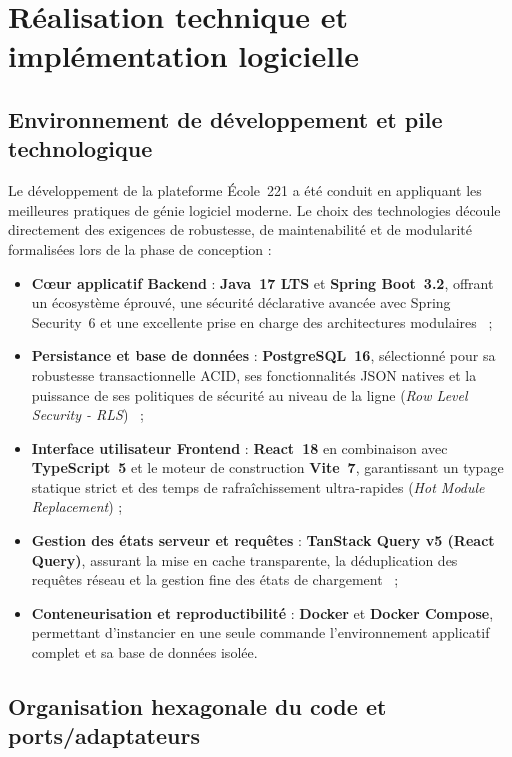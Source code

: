 \chapter{Réalisation technique et implémentation logicielle}

\section{Environnement de développement et pile technologique}

Le développement de la plateforme École~221 a été conduit en appliquant les meilleures pratiques de génie logiciel moderne. Le choix des technologies découle directement des exigences de robustesse, de maintenabilité et de modularité formalisées lors de la phase de conception :

\begin{itemize}
  \item \textbf{Cœur applicatif Backend} : \textbf{Java~17 LTS} et \textbf{Spring Boot~3.2}, offrant un écosystème éprouvé, une sécurité déclarative avancée avec Spring Security~6 et une excellente prise en charge des architectures modulaires~\cite{springdoc2023} ;
  \item \textbf{Persistance et base de données} : \textbf{PostgreSQL~16}, sélectionné pour sa robustesse transactionnelle ACID, ses fonctionnalités JSON natives et la puissance de ses politiques de sécurité au niveau de la ligne (\emph{Row Level Security - RLS})~\cite{postgresrls2023} ;
  \item \textbf{Interface utilisateur Frontend} : \textbf{React~18} en combinaison avec \textbf{TypeScript~5} et le moteur de construction \textbf{Vite~7}, garantissant un typage statique strict et des temps de rafraîchissement ultra-rapides (\emph{Hot Module Replacement}) ;
  \item \textbf{Gestion des états serveur et requêtes} : \textbf{TanStack Query v5 (React Query)}, assurant la mise en cache transparente, la déduplication des requêtes réseau et la gestion fine des états de chargement~\cite{tanstackquery2023} ;
  \item \textbf{Conteneurisation et reproductibilité} : \textbf{Docker} et \textbf{Docker Compose}, permettant d'instancier en une seule commande l'environnement applicatif complet et sa base de données isolée.
\end{itemize}

\section{Organisation hexagonale du code et ports/adaptateurs}

